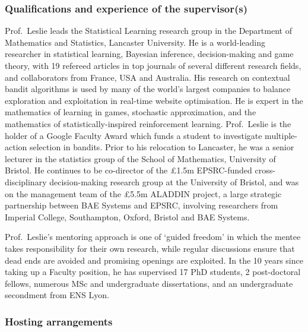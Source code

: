 \documentclass[a4paper,11pt]{article}
\renewcommand{\cite}{\autocite} %
\begin{document}
%

\subsubsection*{Qualifications and experience of the supervisor(s)}

Prof.\ Leslie leads the Statistical Learning research group in the Department of Mathematics and Statistics, Lancaster University.  He is a world-leading researcher in statistical learning, Bayesian inference, decision-making and game theory, with 19 refereed articles in top journals of several different research fields, and collaborators from France, USA and Australia.  His research on contextual bandit algorithms \cite{MayEtAl2012} is used by many of the world's largest companies to balance exploration and exploitation in real-time website optimisation.  He is expert in the mathematics of learning in games, \cite{LeslieCollins03,LeslieCollins05,LeslieCollins06,ChapmanEtAl2013,PerkinsLeslie2014} stochastic approximation, \cite{LeslieCollins03,PerkinsLeslie2012,PerkinsLeslie2014} and the mathematics of statistically-inspired reinforcement learning. \cite{LeslieCollins05,LarsenEtAl2010}  Prof.\ Leslie is the holder of a Google Faculty Award which funds a student to investigate multiple-action selection in bandits.  Prior to his relocation to Lancaster, he was a senior lecturer in the statistics group of the School of Mathematics, University of Bristol.  He continues to be co-director of the \pounds1.5m EPSRC-funded cross-disciplinary decision-making research group at the University of Bristol, and was on the management team of the \pounds5.5m ALADDIN project, a large strategic partnership between BAE Systems and EPSRC, involving researchers from Imperial College, Southampton, Oxford, Bristol and BAE Systems.

Prof.\ Leslie's mentoring approach is one of `guided freedom' in which the mentee takes responsibility for their own research, while regular discussions ensure that dead ends are avoided and promising openings are exploited.  In the 10 years since taking up a Faculty position, he has supervised 17 PhD students, 2 post-doctoral fellows, numerous MSc and undergraduate dissertations, and an undergraduate secondment from ENS Lyon.

\subsubsection*{Hosting arrangements}
\end{document}
